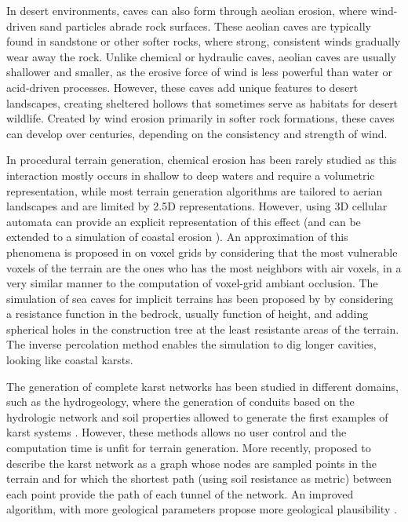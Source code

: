 
In desert environments, caves can also form through aeolian erosion, where wind-driven sand particles abrade rock surfaces. These aeolian caves are typically found in sandstone or other softer rocks, where strong, consistent winds gradually wear away the rock. Unlike chemical or hydraulic caves, aeolian caves are usually shallower and smaller, as the erosive force of wind is less powerful than water or acid-driven processes. However, these caves add unique features to desert landscapes, creating sheltered hollows that sometimes serve as habitats for desert wildlife. Created by wind erosion primarily in softer rock formations, these caves can develop over centuries, depending on the consistency and strength of wind.


\smallConclusion

In procedural terrain generation, chemical erosion has been rarely studied as this interaction mostly occurs in shallow to deep waters and require a volumetric representation, while most terrain generation algorithms are tailored to aerian landscapes and are limited by 2.5D representations. However, using 3D cellular automata can provide an explicit representation of this effect \cite{Menshutina2020} (and can be extended to a simulation of coastal erosion \cite{Hawick2014}). An approximation of this phenomena is proposed in \cite{Beardall2007,Jones2010} on voxel grids by considering that the most vulnerable voxels of the terrain are the ones who has the most neighbors with air voxels, in a very similar manner to the computation of voxel-grid ambiant occlusion. The simulation of sea caves for implicit terrains has been proposed by \cite{Paris2018} by considering a resistance function in the bedrock, usually function of height, and adding spherical holes in the construction tree at the least resistante areas of the terrain. The inverse percolation method enables the simulation to dig longer cavities, looking like coastal karsts.

The generation of complete karst networks has been studied in different domains, such as the hydrogeology, where the generation of conduits based on the hydrologic network and soil properties allowed to generate the first examples of karst systems \cite{Jaquet2004,Pardo2012,Pytel2015}. However, these methods allows no user control and the computation time is unfit for terrain generation. More recently, \cite{Paris2021} proposed to describe the karst network as a graph whose nodes are sampled points in the terrain and for which the shortest path (using soil resistance as metric) between each point provide the path of each tunnel of the network. An improved algorithm, with more geological parameters propose more geological plausibility \cite{Gouy2024}.


